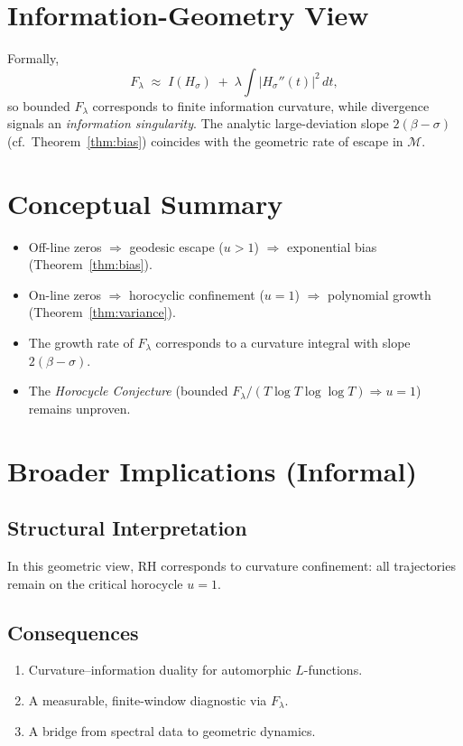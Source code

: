\section{Information-Geometry View}\label{sec:infogeom}

Formally,
\[
F_\lambda \;\approx\; I(H_\sigma)
  \;+\; \lambda\!\int |H_\sigma''(t)|^2\,dt,
\]
so bounded $F_\lambda$ corresponds to finite information curvature,
while divergence signals an \emph{information singularity}.
The analytic large-deviation slope $2(\beta-\sigma)$
(cf.~Theorem~\ref{thm:bias}) coincides with the geometric rate of escape
in $\mathcal{M}$.

\section{Conceptual Summary}

\begin{itemize}
  \item Off-line zeros $\Rightarrow$ geodesic escape ($u>1$) $\Rightarrow$ exponential bias (Theorem~\ref{thm:bias}).  
  \item On-line zeros $\Rightarrow$ horocyclic confinement ($u=1$) $\Rightarrow$ polynomial growth (Theorem~\ref{thm:variance}).  
  \item The growth rate of $F_\lambda$ corresponds to a curvature integral with slope $2(\beta-\sigma)$.  
  \item The \emph{Horocycle Conjecture}
        (bounded $F_\lambda/(T\log T\log\log T)\Rightarrow u=1$) remains unproven.  
\end{itemize}

\section{Broader Implications (Informal)}

\subsection{Structural Interpretation}
In this geometric view, RH corresponds to curvature confinement:
all trajectories remain on the critical horocycle $u=1$.

\subsection{Consequences}
\begin{enumerate}
  \item Curvature–information duality for automorphic $L$-functions.
  \item A measurable, finite-window diagnostic via $F_\lambda$.
  \item A bridge from spectral data to geometric dynamics.
\end{enumerate}

